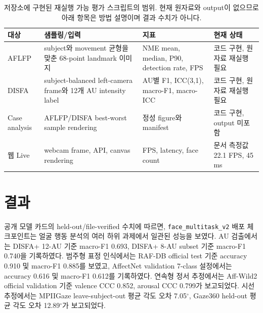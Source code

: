 \documentclass[11pt]{article}
\newcommand{\model}{\texttt{face\_multitask\_v2}}
\begin{document}
\begin{table}[t]
\centering
\caption{저장소에 구현된 재실행 가능 평가 스크립트의 범위. 현재 원자료와 output이 없으므로 아래 항목은 방법 설명이며 결과 수치가 아니다.}
\label{tab:localprotocol}
\begin{tabularx}{\linewidth}{lXlX}
\toprule
대상 & 샘플링/입력 & 지표 & 현재 상태 \\
\midrule
AFLFP & subject와 movement 균형을 맞춘 68-point landmark 이미지 & NME mean, median, P90, detection rate, FPS & 코드 구현, 원자료 재실행 필요 \\
DISFA & subject-balanced left-camera frame와 12개 AU intensity label & AU별 F1, ICC(3,1), macro-F1, macro-ICC & 코드 구현, 원자료 재실행 필요 \\
Case analysis & AFLFP/DISFA best-worst sample rendering & 정성 figure와 manifest & 코드 구현, output 미포함 \\
웹 Live & webcam frame, API, canvas rendering & FPS, latency, face count & 문서 측정값 22.1 FPS, 45 ms \\
\bottomrule
\end{tabularx}
\end{table}

\section{결과}

공개 모델 카드의 held-out/file-verified 수치에 따르면, \model{} 배포 체크포인트는 얼굴 행동 분석의 여러 하위 과제에서 일관된 성능을 보였다. AU 검출에서는 DISFA+ 12-AU 기준 macro-F1 0.693, DISFA+ 8-AU subset 기준 macro-F1 0.740을 기록하였다. 범주형 표정 인식에서는 RAF-DB official test 기준 accuracy 0.910 및 macro-F1 0.885를 보였고, AffectNet validation 7-class 설정에서는 accuracy 0.616 및 macro-F1 0.612를 기록하였다\cite{Li_2017,Mollahosseini_2019}. 연속형 정서 추정에서는 Aff-Wild2 official validation 기준 valence CCC 0.852, arousal CCC 0.799가 보고되었다\cite{Zafeiriou_2017}. 시선 추정에서는 MPIIGaze leave-subject-out 평균 각도 오차 7.05$^\circ$, Gaze360 held-out 평균 각도 오차 12.89$^\circ$가 보고되었다\cite{Zhang_2019,Kellnhofer_2019}.
\end{document}
